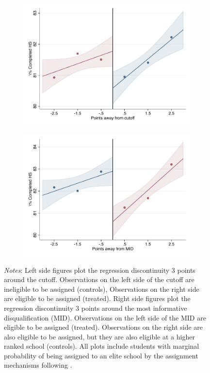 \documentclass[oneside,11pt]{article}
\begin{document}
\begin{figure}[H]
\begin{center}
    \begin{subfigure}{0.475\textwidth}
        \centering
        \includegraphics[width=\textwidth]{04_Figures/rd_plot_tau_bachillerato_mas_UNAM3.pdf}
    \end{subfigure}
    \begin{subfigure}{0.475\textwidth}
        \centering
        \includegraphics[width=\textwidth]{04_Figures/rd_plot_mid_bachillerato_mas_UNAM3.pdf}
    \end{subfigure}
    \end{center}
    
\footnotesize
\textit{Notes}: Left side figures plot the regression discontinuity 3 points around the cutoff. Observations on the left side of the cutoff are ineligible to be assigned (controls), Observations on the right side are eligible to be assigned (treated). Right side figures plot the regression discontinuity 3 points around the most informative disqualification (MID). Observations on the left side of the MID are eligible to be assigned (treated). Observations on the right side are also eligible to be assigned, but they are also eligible at a higher ranked school (controls). All plots include students with marginal probability of being assigned to an elite school by the assignment mechanisms following \citet{abdulkadirouglu2022breaking}. 
\end{figure}
\end{document}
